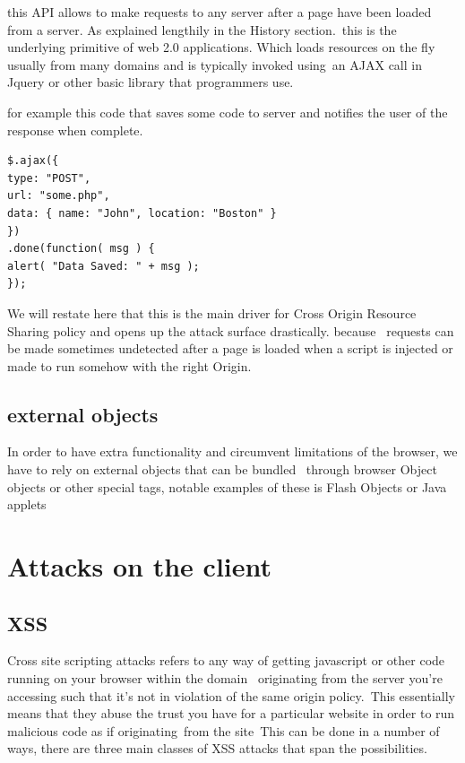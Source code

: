 this API allows to make requests to any server after a page have been loaded from a server. As explained lengthily in the History section.\
this is the underlying primitive of web 2.0 applications. Which loads resources on the fly usually from many domains and is typically invoked using\
an AJAX call in Jquery or other basic library that programmers use.

for example this code that saves some code to server  and notifies the user of the response when complete.
\begin{verbatim}
$.ajax({
type: "POST",
url: "some.php",
data: { name: "John", location: "Boston" }
})
.done(function( msg ) {
alert( "Data Saved: " + msg );
});\end{verbatim}

We will restate here that this is the main driver for Cross Origin Resource Sharing policy and opens up the attack surface drastically. because \
requests can be made sometimes undetected after a page is loaded when a script is injected or made to run somehow with the right Origin.\

\subsection{external objects}

In order to have extra functionality and circumvent limitations of the browser, we have to rely on external objects that can be bundled \
through browser Object objects or other special tags, notable examples of these is Flash Objects or Java applets

\section{Attacks on the client}

\subsection{XSS}


Cross site scripting attacks refers to any way of getting javascript or other code running on your browser within the domain \
originating from the server you're accessing such that it's not in violation of the same origin policy.\
This essentially means that they abuse the trust you have for a particular website in order to run malicious code as if originating\
from the site\
This can be done in a number of ways, there are three main classes of XSS attacks that span the possibilities.\\

